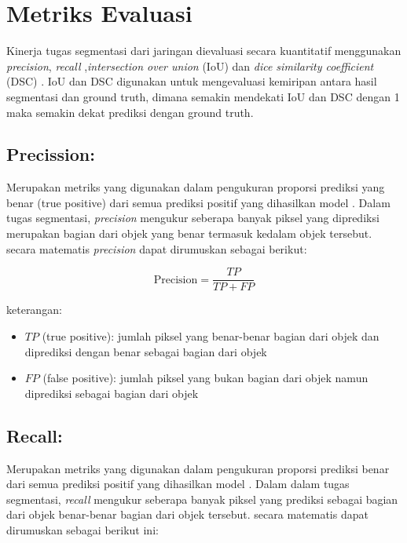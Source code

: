 \section{Metriks Evaluasi}
\noindent Kinerja tugas segmentasi dari jaringan dievaluasi secara kuantitatif menggunakan \textit{precision}, \textit{recall} ,\textit{intersection over union }(IoU) dan \textit{dice similarity coefficient }(DSC) \cite{jiang_iu-net_2023}. IoU dan DSC digunakan untuk mengevaluasi kemiripan antara hasil segmentasi dan ground truth, dimana semakin mendekati IoU dan DSC dengan 1 maka semakin dekat prediksi dengan ground truth. %

\subsection{Precission:}
\noindent Merupakan metriks yang digunakan dalam pengukuran proporsi prediksi yang benar (true positive) dari semua prediksi positif yang dihasilkan model \cite{jiang_iu-net_2023}. Dalam tugas segmentasi, \textit{precision} mengukur seberapa banyak piksel yang diprediksi merupakan bagian dari objek yang benar termasuk kedalam objek tersebut. secara matematis \textit{precision} dapat dirumuskan sebagai berikut:

\begin{equation}
	\text{Precision} = \frac{TP}{TP + FP}
\end{equation}

\noindent
keterangan:
\begin{itemize}
	\item $TP$ (true positive): jumlah piksel yang benar-benar bagian dari objek dan diprediksi dengan benar sebagai bagian dari objek
	\item $FP$ (false positive): jumlah piksel yang bukan bagian dari objek namun diprediksi sebagai bagian dari objek
\end{itemize}

\subsection{Recall:}
\noindent Merupakan metriks yang digunakan dalam pengukuran proporsi prediksi benar dari semua prediksi positif yang dihasilkan model \cite{jiang_iu-net_2023}.  Dalam dalam tugas segmentasi, \textit{recall} mengukur seberapa banyak piksel yang prediksi sebagai bagian dari objek benar-benar bagian dari objek tersebut. secara matematis dapat dirumuskan sebagai berikut ini:

